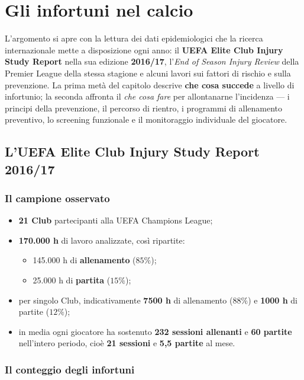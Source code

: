 \chapter{Gli infortuni nel calcio}

L'argomento si apre con la lettura dei dati epidemiologici che la ricerca internazionale mette a
disposizione ogni anno: il \textbf{UEFA Elite Club Injury Study Report} nella sua edizione
\textbf{2016/17}, l'\textit{End of Season Injury Review} della Premier League della stessa stagione
e alcuni lavori sui fattori di rischio e sulla prevenzione. La prima metà del capitolo descrive
\textbf{che cosa succede} a livello di infortunio; la seconda affronta il \textit{che cosa fare} per
allontanarne l'incidenza --- i principi della prevenzione, il percorso di rientro, i programmi di
allenamento preventivo, lo screening funzionale e il monitoraggio individuale del giocatore.

\section{L'UEFA Elite Club Injury Study Report 2016/17}

\subsection{Il campione osservato}

\begin{itemize}
  \item \textbf{21 Club} partecipanti alla UEFA Champions League;
  \item \textbf{170.000 h} di lavoro analizzate, così ripartite:
    \begin{itemize}
      \item 145.000 h di \textbf{allenamento} ($85\%$);
      \item 25.000 h di \textbf{partita} ($15\%$);
    \end{itemize}
  \item per singolo Club, indicativamente \textbf{7500 h} di allenamento ($88\%$) e \textbf{1000 h}
    di partite ($12\%$);
  \item in media ogni giocatore ha sostenuto \textbf{232 sessioni allenanti} e \textbf{60 partite}
    nell'intero periodo, cioè \textbf{21 sessioni} e \textbf{5,5 partite} al mese.
\end{itemize}

\subsection{Il conteggio degli infortuni}

